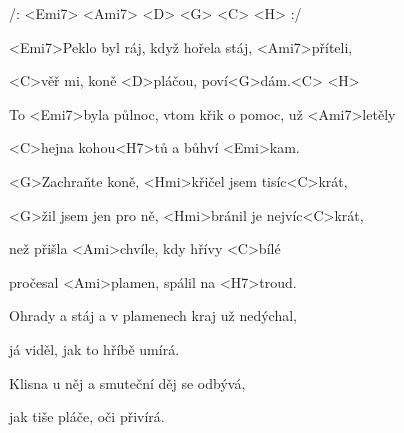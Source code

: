 

/: <Emi7> <Ami7> <D> <G> <C> <H> :/

\zs

<Emi7>Peklo byl ráj, když hořela stáj, <Ami7>příteli,

<C>věř mi, koně <D>pláčou, poví<G>dám.<C> <H>

To <Emi7>byla půlnoc, vtom křik o pomoc, už <Ami7>letěly

<C>hejna kohou<H7>tů a bůhví <Emi>kam.
\ks

\zr
<G>Zachraňte koně, <Hmi>křičel jsem tisíc<C>krát,

<G>žil jsem jen pro ně, <Hmi>bránil je nejvíc<C>krát,

než přišla <Ami>chvíle, kdy hřívy <C>bílé

pročesal <Ami>plamen, spálil na <H7>troud.
\kr


\zs
Ohrady a stáj a v plamenech kraj už nedýchal,

já viděl, jak to hříbě umírá.

Klisna u něj a smuteční děj se odbývá,

jak tiše pláče, oči přivírá.

\ks

\zr
\kr
\kp
